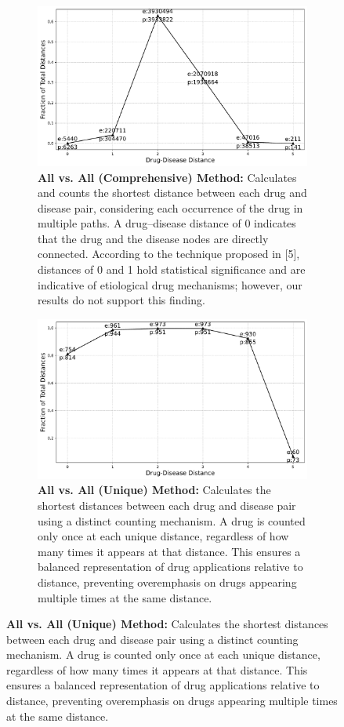\documentclass[journal,twoside,web]{ieeecolor}
\begin{document}
\begin{figure}
\centering
\begin{subfigure}{\linewidth}
   \includegraphics[width=\linewidth]{Figures/Yildrim_all_shortest_distance.pdf}
   \caption{\textbf{All vs. All (Comprehensive) Method:} Calculates and counts the shortest distance between each drug and disease pair, considering each occurrence of the drug in multiple paths.
   A drug–disease distance of 0 indicates that the drug and the disease nodes are directly connected.
   According to the technique proposed in [5], distances of 0 and 1 hold statistical significance and are indicative of etiological drug mechanisms; however, our results do not support this finding.}
   \label{fig:yildirim1}
\end{subfigure}
\begin{subfigure}{\linewidth}
   \includegraphics[width=\linewidth]{Figures/Yildrim_ALL_unique_drug_count_shortest_distance.pdf}
   \caption{\textbf{All vs. All (Unique) Method:} 
   Calculates the shortest distances between each drug and disease pair using a distinct counting mechanism. A drug is counted only once at each unique distance, regardless of how many times it appears at that distance. This ensures a balanced representation of drug applications relative to distance, preventing overemphasis on drugs appearing multiple times at the same distance.}

\end{subfigure}
\end{figure}
\end{document}
